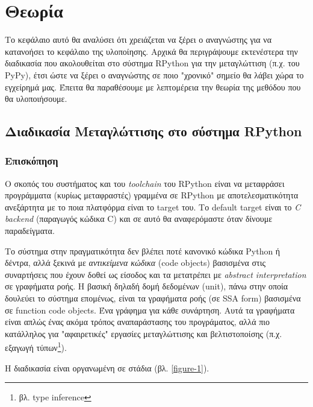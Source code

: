 
\chapter{Θεωρία}
\label{chapter3} 

Το κεφάλαιο αυτό θα αναλύσει ότι χρειάζεται να ξέρει ο αναγνώστης για να
κατανοήσει το κεφάλαιο της υλοποίησης. Αρχικά θα περιγράψουμε εκτενέστερα την
διαδικασία που ακολουθείται στο σύστημα RPython για την μεταγλώττιση (π.χ. του
PyPy), έτσι ώστε να ξέρει ο αναγνώστης σε ποιο "χρονικό" σημείο θα λάβει χώρα το
εγχείρημά μας. Έπειτα θα παραθέσουμε με λεπτομέρεια την θεωρία της μεθόδου που
θα υλοποιήσουμε.


\section{Διαδικασία Μεταγλώττισης στο σύστημα RPython}

\subsection{Επισκόπηση}

Ο σκοπός του συστήματος και του \textit{toolchain} του RPython είναι να
μεταφράσει προγράμματα (κυρίως μεταφραστές) γραμμένα σε RPython με
αποτελεσματικότητα ανεξάρτητα με το ποια πλατφόρμα είναι το target του. Το
default target είναι το \textit{C backend} (παραγωγός κώδικα C) και σε αυτό θα
αναφερόμαστε όταν δίνουμε παραδείγματα.

Το σύστημα στην πραγματικότητα δεν βλέπει ποτέ κανονικό κώδικα Python ή
δέντρα, αλλά ξεκινά με \textit{αντικείμενα κώδικα} (code objects) βασισμένα
στις συναρτήσεις που έχουν δοθεί ως είσοδος και τα μετατρέπει με
\textit{abstract interpretation}\cite{CousotCousot77}\cite{debray1995abstract}
σε γραφήματα ροής. Η βασική δηλαδή δομή δεδομένων (unit), πάνω στην οποία
δουλεύει το σύστημα επομένως, είναι τα γραφήματα ροής (σε SSA\cite{ssa} form)
βασισμένα σε function code objects. Ένα γράφημα για κάθε συνάρτηση. Αυτά τα
γραφήματα είναι απλώς ένας ακόμα τρόπος αναπαράστασης του προγράματος, αλλά
πιο κατάλληλος για "αφαιρετικές" εργασίες μεταγλώττισης και βελτιστοποίσης
(π.χ. εξαγωγή τύπων\footnote{βλ. type inference}).

Η διαδικασία είναι οργανωμένη σε στάδια (βλ. \ref{figure-1}).


